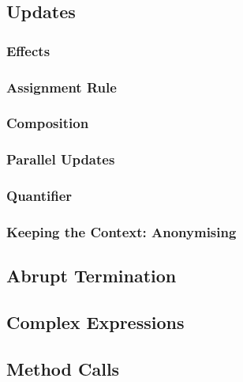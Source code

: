 \documentclass[a4paper, 11pt, accentcolor = tud3b]{tudreport}
\begin{document}
			\subsection{Updates} %

				\subsubsection{Effects} %

				\subsubsection{Assignment Rule} %

				\subsubsection{Composition} %

				\subsubsection{Parallel Updates} %

				\subsubsection{Quantifier} %

				\subsubsection{Keeping the Context: Anonymising} %

			\subsection{Abrupt Termination} %

			\subsection{Complex Expressions} %

			\subsection{Method Calls} %
\end{document}
